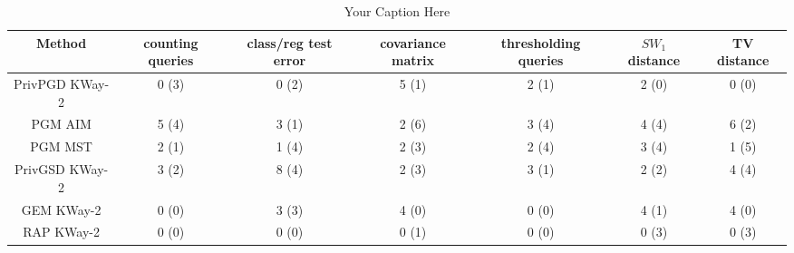 \begin{table}[t!]
\centering
\begin{tabular}{ccccccc}
\toprule
Method & counting queries & class/reg test error & covariance matrix & thresholding queries & $SW_1$ distance & TV distance \\
\midrule
 PrivPGD KWay-2 & 0 (3) & 0 (2) & 5 (1) & 2 (1) & 2 (0) & 0 (0) \\
 PGM AIM & 5 (4) & 3 (1) & 2 (6) & 3 (4) & 4 (4) & 6 (2) \\
 PGM MST & 2 (1) & 1 (4) & 2 (3) & 2 (4) & 3 (4) & 1 (5) \\
 PrivGSD KWay-2 & 3 (2) & 8 (4) & 2 (3) & 3 (1) & 2 (2) & 4 (4) \\
 GEM KWay-2 & 0 (0) & 3 (3) & 4 (0) & 0 (0) & 4 (1) & 4 (0) \\
 RAP  KWay-2 & 0 (0) & 0 (0) & 0 (1) & 0 (0) & 0 (3) & 0 (3) \\
\bottomrule
\end{tabular}
\caption{Your Caption Here}
\label{tab:your_label}
\end{table}